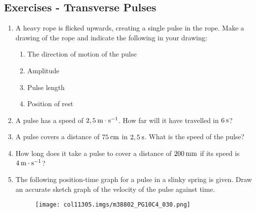             \subsection{ Exercises - Transverse Pulses}
            \nopagebreak
      \label{m38802*id316647}\begin{enumerate}[noitemsep, label=\textbf{\arabic*}. ] 
            \label{m38802*uid66}\item A heavy rope is flicked upwards, creating a single pulse in the rope. Make a drawing of the rope and indicate the following in your drawing:
\label{m38802*id316663}\begin{enumerate}[noitemsep, label=\textbf{\alph*}. ] 
            \label{m38802*uid67}\item The direction of motion of the pulse
\label{m38802*uid68}\item Amplitude
\label{m38802*uid69}\item Pulse length
\label{m38802*uid70}\item Position of rest
\end{enumerate}
                \label{m38802*uid71}\item A pulse has a speed of $2,5\phantom{\rule{2pt}{0ex}}\mathrm{m}\ensuremath{\cdot}\mathrm{s}{}^{-1}$. How far will it have travelled in $6\phantom{\rule{2pt}{0ex}}\mathrm{s}$?\newline
\label{m38802*uid72}\item A pulse covers a distance of $75\phantom{\rule{2pt}{0ex}}\mathrm{cm}$ in $2,5\phantom{\rule{2pt}{0ex}}\mathrm{s}$. What is the speed of the pulse?\newline
\label{m38802*uid73}\item How long does it take a pulse to cover a distance of $200\phantom{\rule{2pt}{0ex}}\mathrm{mm}$ if its speed is $4\phantom{\rule{2pt}{0ex}}\mathrm{m}\ensuremath{\cdot}\mathrm{s}{}^{-1}$?\newline
\label{m38802*uid74}\item The following position-time graph for a pulse in a slinky spring is given. Draw an accurate sketch graph of the velocity of the pulse against time.
    \setcounter{subfigure}{0}
	\begin{figure}[H] %
    \begin{center}
    \label{m38802*id316803!!!underscore!!!media}\label{m38802*id316803!!!underscore!!!printimage}\texttt{[image: col11305.imgs/m38802\_PG10C4\_030.png]} %
      \vspace{2pt}

\end{center}
\end{figure}
\end{enumerate}
